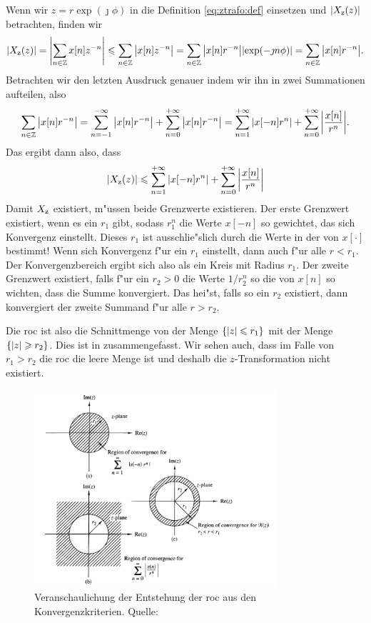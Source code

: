 Wenn wir $z = r\exp(\jmath \phi)$ in die Definition \eqref{eq:ztrafo:def} einsetzen und ${\left| X_{\rm z}(z) \right|}$ betrachten, finden wir
\[
{\left| X_{\rm z}(z) \right|} 
    = {\left| {\sum\limits_{n\in\mathbb{Z}}^{}{x[n] z^{-n}}} \right|}
    \leqslant {\sum\limits_{n\in\mathbb{Z}}^{}{{\left| x[n] z^{-n} \right|}}}
    = {\sum\limits_{n\in\mathbb{Z}}^{}{{\left| x[n] r^{-n} \right|} {\left| \exp(- \jmath n \phi) \right|}}}
    = {\sum\limits_{n\in\mathbb{Z}}^{}{{\left| x[n] r^{-n} \right|}}}.
\]
Betrachten wir den letzten Ausdruck genauer indem wir ihn in zwei Summationen aufteilen, also
\[
{\sum\limits_{n\in\mathbb{Z}}^{}{{\left| x[n] r^{-n} \right|}}} 
    = {\sum\limits_{n=-1}^{-\infty}{{\left| x[n] r^{-n} \right|}}}
    + {\sum\limits_{n=0}^{+\infty}{{\left| x[n] r^{-n} \right|}}}
    = {\sum\limits_{n=1}^{+\infty}{{\left| x[-n] r^{n} \right|}}}
    + {\sum\limits_{n=0}^{+\infty}{{\left| \frac{x[n]}{r^{n}} \right|}}}.
\]
Das ergibt dann also, dass
\[
    {\left| X_{\rm z}(z) \right|} 
        \leqslant {\sum\limits_{n=1}^{+\infty}{{\left| x[-n] r^{n} \right|}}}
        + {\sum\limits_{n=0}^{+\infty}{{\left| \frac{x[n]}{r^{n}} \right|}}}
\]
Damit $X_{\rm z}$ existiert, m"ussen beide Grenzwerte existieren.
Der erste Grenzwert existiert, wenn es ein $r_1$ gibt, sodass $r_1^n$ die Werte $x[-n]$ so gewichtet, das sich Konvergenz einstellt. 
Dieses $r_1$ ist ausschlie"slich durch die Werte in der  von $x[\cdot]$ bestimmt! 
Wenn sich Konvergenz f"ur ein $r_1$ einstellt, dann auch f"ur alle $r < r_1$.
Der Konvergenzbereich ergibt sich also als ein Kreis mit Radius $r_1$.
Der zweite Grenzwert existiert, falls f"ur ein $r_2 > 0$ die Werte $1/r_2^n$ so die  von $x[n]$ so wichten, dass die Summe konvergiert.
Das hei"st, falls so ein $r_2$ existiert, dann konvergiert der zweite Summand f"ur alle $r > r_2$.

Die \gls{roc} ist also die Schnittmenge von der Menge $\{{\left| z \right|} \leqslant r_1\}$ mit der Menge $\{{\left| z \right|} \geqslant r_2\}$.
Dies ist in  zusammengefasst. Wir sehen auch, dass im Falle von $r_1 > r_2$ die \gls{roc} die leere Menge ist und deshalb die $z$-Transformation nicht existiert.

\begin{figure}
    \centering\includegraphics[width=0.8\textwidth]{img/ztrafo/roc.png}
    \caption{Veranschaulichung der Entstehung der \acrshort*{roc} aus den Konvergenzkriterien. Quelle: \cite{proakis2013}}\label{fig:ztrafo:roc}
\end{figure}
%
